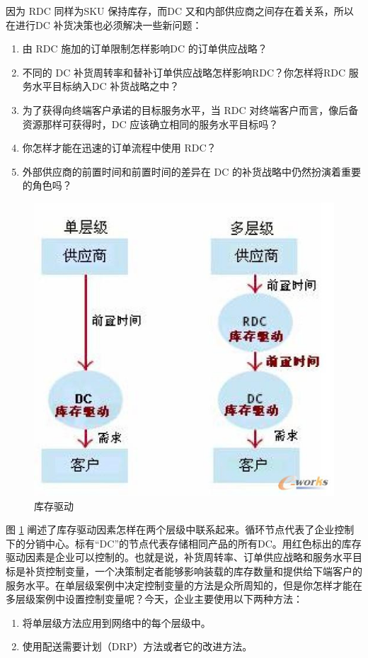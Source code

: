     因为 RDC 同样为SKU 保持库存，而DC 又和内部供应商之间存在着关系，所以在进行DC 补货决策也必须解决一些新问题：

    \begin{enumerate}
        \item  由 RDC 施加的订单限制怎样影响DC 的订单供应战略？
        \item  不同的 DC 补货周转率和替补订单供应战略怎样影响RDC？你怎样将RDC 服务水平目标纳入DC 补货战略之中？
        \item  为了获得向终端客户承诺的目标服务水平，当 RDC 对终端客户而言，像后备资源那样可获得时，DC 应该确立相同的服务水平目标吗？
        \item  你怎样才能在迅速的订单流程中使用 RDC？
        \item  外部供应商的前置时间和前置时间的差异在 DC 的补货战略中仍然扮演着重要的角色吗？
    \end{enumerate}

    \begin{figure}[bcth]
        \begin{center}
            \includegraphics[scale=.6] {ml-info.jpg}
            \caption {库存驱动} \label {fig:mlinfo}
        \end{center}
    \end{figure}

    图 \ref{fig:mlinfo} 阐述了库存驱动因素怎样在两个层级中联系起来。循环节点代表了企业控制下的分销中心。标有“DC”的节点代表存储相同产品的所有DC。用红色标出的库存驱动因素是企业可以控制的。也就是说，补货周转率、订单供应战略和服务水平目标是补货控制变量，一个决策制定者能够影响装载的库存数量和提供给下端客户的服务水平。在单层级案例中决定控制变量的方法是众所周知的，但是你怎样才能在多层级案例中设置控制变量呢？今天，企业主要使用以下两种方法：

    \begin{enumerate}
        \item  将单层级方法应用到网络中的每个层级中。
        \item  使用配送需要计划（DRP）方法或者它的改进方法。
    \end{enumerate}
